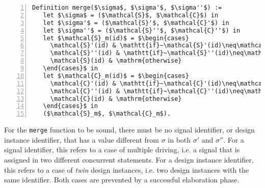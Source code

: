 \begin{lstlisting}[language=PseudoCoq,label={lst:merge-functionr},
caption={[The \texttt{merge} function.] The \texttt{merge} function that fuses together an origin state $\sigma$, with two states $\sigma'$ and $\sigma''$ generated by the execution of two \hvhdl{} concurrent statements.},framexleftmargin=1.5em,xleftmargin=2em,numbers=left,
numberstyle=\tiny\ttfamily]
Definition merge($\sigma$, $\sigma'$, $\sigma''$) :=
   let $\sigma$ = ($\mathcal{S}$, $\mathcal{C}$) in
   let $\sigma'$ = ($\mathcal{S}'$, $\mathcal{C}'$) in
   let $\sigma''$ = ($\mathcal{S}''$, $\mathcal{C}''$) in
   let $\mathcal{S}_m(id)$ = $\begin{cases} 
     \mathcal{S}'(id) & \mathtt{if}~\mathcal{S}'(id)\neq\mathcal{S}(id) \\ 
     \mathcal{S}''(id) & \mathtt{if}~\mathcal{S}''(id)\neq\mathcal{S}(id) \\
     \mathcal{S}(id) & \mathrm{otherwise}
   \end{cases}$ in
   let $\mathcal{C}_m(id)$ = $\begin{cases} 
     \mathcal{C}'(id) & \mathtt{if}~\mathcal{C}'(id)\neq\mathcal{C}(id) \\ 
     \mathcal{C}''(id) & \mathtt{if}~\mathcal{C}''(id)\neq\mathcal{C}(id) \\
     \mathcal{C}(id) & \mathrm{otherwise}
   \end{cases}$ in 
   ($\mathcal{S}_m$, $\mathcal{C}_m$).
\end{lstlisting}

For the \texttt{merge} function to be sound, there must be no signal
identifier, or design instance identifier, that has a value different
from $\sigma$ in both $\sigma'$ and $\sigma''$. For a signal
identifier, this refers to a case of multiple driving, i.e. a signal
that is assigned in two different concurrent statements. For a design
instance identifier, this refers to a case of \textit{twin} design
instances, i.e. two design instances with the same identifier. Both
cases are prevented by a successful elaboration phase.


